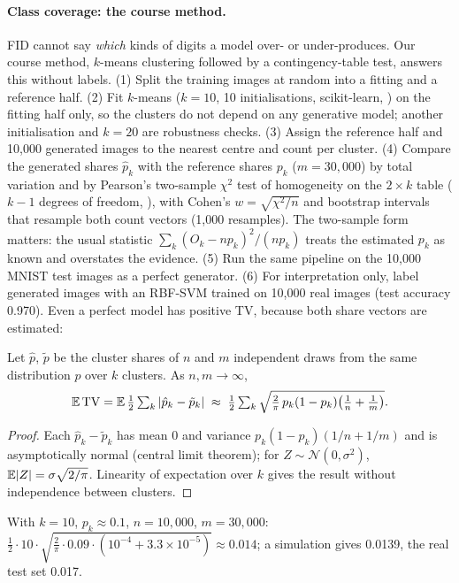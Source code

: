 \paragraph{Class coverage: the course method.} FID cannot say \emph{which} kinds of digits a model over- or under-produces. Our course method, $k$-means clustering \citep{lloyd1982kmeans} followed by a contingency-table test, answers this without labels. (1) Split the training images at random into a fitting and a reference half. (2) Fit $k$-means ($k=10$, 10 initialisations, scikit-learn, \citealp{pedregosa2011sklearn}) on the fitting half only, so the clusters do not depend on any generative model; another initialisation and $k=20$ are robustness checks. (3) Assign the reference half and 10,000 generated images to the nearest centre and count per cluster. (4) Compare the generated shares $\hat p_k$ with the reference shares $p_k$ ($m=30{,}000$) by total variation and by Pearson's two-sample $\chi^2$ test of homogeneity on the $2\times k$ table ($k-1$ degrees of freedom, \citealp[\S3.2]{agresti2013cda}), with Cohen's $w=\sqrt{\chi^2/n}$ \citep{cohen1988power} and bootstrap intervals \citep{efron1979bootstrap} that resample both count vectors (1,000 resamples). The two-sample form matters: the usual statistic $\sum_k(O_k-np_k)^2/(np_k)$ treats the estimated $p_k$ as known and overstates the evidence. (5) Run the same pipeline on the 10,000 MNIST test images as a perfect generator. (6) For interpretation only, label generated images with an RBF-SVM trained on 10,000 real images (test accuracy 0.970). Even a perfect model has positive TV, because both share vectors are estimated: %
\begin{proposition}\label{prop:tvfloor}
Let $\hat p$, $\tilde p$ be the cluster shares of $n$ and $m$ independent draws from the same distribution $p$ over $k$ clusters. As $n,m\to\infty$,
\begin{equation}\label{eq:tv}
\mathbb{E}\,\mathrm{TV}=\mathbb{E}\,\tfrac12\textstyle\sum_k|\hat p_k-\tilde p_k|\;\approx\;\tfrac12\sum_k\sqrt{\tfrac{2}{\pi}\,p_k(1-p_k)\big(\tfrac1n+\tfrac1m\big)} .
\end{equation}
\end{proposition}
\begin{proof}
Each $\hat p_k-\tilde p_k$ has mean 0 and variance $p_k(1-p_k)(1/n+1/m)$ and is asymptotically normal (central limit theorem); for $Z\sim\mathcal N(0,\sigma^2)$, $\mathbb{E}|Z|=\sigma\sqrt{2/\pi}$. Linearity of expectation over $k$ gives the result without independence between clusters.
\end{proof}
With $k=10$, $p_k\approx0.1$, $n=10{,}000$, $m=30{,}000$: $\tfrac12\cdot10\cdot\sqrt{\tfrac2\pi\cdot0.09\cdot(10^{-4}+3.3\times10^{-5})}\approx0.014$; a simulation gives 0.0139, the real test set 0.017.
